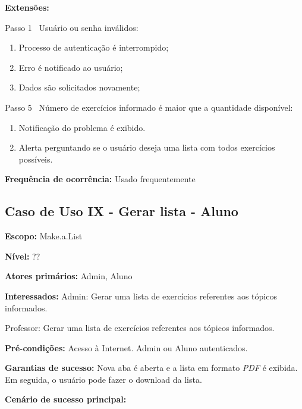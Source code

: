 \documentclass[12pt,oneside,a4paper,article]{abntex2}
\begin{document}
			\textbf{Extensões:} 
			
			Passo 1 \textrightarrow \ Usuário ou senha inválidos:
			
			\begin{enumerate}[label=\alph*.]	
				\item Processo de autenticação é interrompido;
				\item Erro é notificado ao usuário;
				\item Dados são solicitados novamente;
			\end{enumerate}
			
			Passo 5 \textrightarrow \ Número de exercícios informado é maior que a quantidade disponível:
			
			\begin{enumerate}[label=\alph*.]	
				\item Notificação do problema é exibido.
				\item Alerta perguntando se o usuário deseja uma lista com todos exercícios possíveis.
			\end{enumerate}
			
			\textbf{Frequência de ocorrência:} Usado frequentemente
			
	
		\subsection{Caso de Uso IX - Gerar lista - Aluno}
		
		
		\textbf{Escopo:} Make.a.List 
		
		\textbf{Nível:} ??
		
		\textbf{Atores primários:} Admin, Aluno
		
		\textbf{Interessados:} Admin: Gerar uma lista de exercícios referentes aos tópicos informados.
		
		Professor: Gerar uma lista de exercícios referentes aos tópicos informados.
		
		\textbf{Pré-condições:} Acesso à Internet. Admin ou Aluno autenticados.
		
		\textbf{Garantias de sucesso:} Nova aba é aberta e a lista em formato \textit{PDF} é exibida. Em seguida, o usuário pode fazer o download da lista.
		
		\textbf{Cenário de sucesso principal:} 
		
\end{document}
